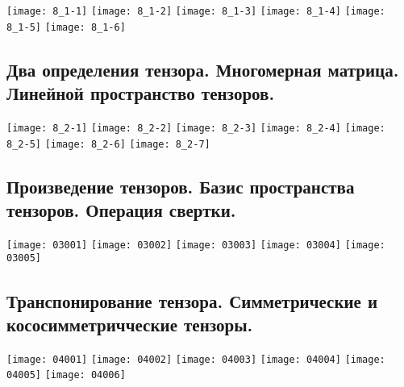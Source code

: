 \documentclass[../main.tex]{subfiles}
\begin{document}
		\texttt{[image: 8\_1-1]}	
		\n
		\texttt{[image: 8\_1-2]}	
		\n
		\texttt{[image: 8\_1-3]}	
		\n
		\texttt{[image: 8\_1-4]}	
		\n
		\texttt{[image: 8\_1-5]}	
		\n
		\texttt{[image: 8\_1-6]}	
		\n
	\subsection{Два определения тензора. Многомерная матрица. Линейной пространство тензоров.}
	 		\texttt{[image: 8\_2-1]}	
		\n
		\texttt{[image: 8\_2-2]}	
		\n
		\texttt{[image: 8\_2-3]}	
		\n
		\texttt{[image: 8\_2-4]}	
		\n
		\texttt{[image: 8\_2-5]}	
		\n
		\texttt{[image: 8\_2-6]}	
		\n
		\texttt{[image: 8\_2-7]}	
		
		
	\subsection{Произведение тензоров. Базис пространства тензоров. Операция свертки.}
	 		\texttt{[image: 03001]}	
		\n
		\texttt{[image: 03002]}	
		\n
		\texttt{[image: 03003]}		
		\n
		\texttt{[image: 03004]}	
		\n
		\texttt{[image: 03005]}	
		\n			
		
		
	\subsection{Транспонирование тензора. Симметрические и кососимметричческие тензоры.}
	 	\texttt{[image: 04001]}	
		\n
		\texttt{[image: 04002]}	
		\n
		\texttt{[image: 04003]}	
		\n
		\texttt{[image: 04004]}	
		\n
		\texttt{[image: 04005]}	
		\n
		\texttt{[image: 04006]}	
		\n			
		
\end{document}
